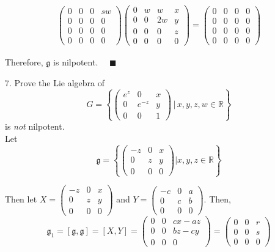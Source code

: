\documentclass[12pt]{article}
\newcommand{\R}{\mathbb{R}}
\newcommand{\g}{\mathfrak{g}}
\newcommand{\qed}{\quad \blacksquare}
\begin{document}
\begin{align*}
\begin{pmatrix}
                0 & 0 & 0 & sw\\ 
                0 & 0 & 0 & 0\\
                0 & 0 & 0 & 0\\
                0 & 0 & 0 & 0
            \end{pmatrix}\begin{pmatrix}
                0 & w & w & x\\ 
                0 & 0 & 2w & y\\
                0 & 0 & 0 & z\\
                0 & 0 & 0 & 0
            \end{pmatrix} = \begin{pmatrix}
                0 & 0 & 0 & 0\\ 
                0 & 0 & 0 & 0\\
                0 & 0 & 0 & 0\\
                0 & 0 & 0 & 0
            \end{pmatrix}
        \end{align*}

        Therefore, $\g$ is nilpotent. $\qed$
    \color{black}


\pagebreak

7.  Prove the Lie algebra of 
\[
G = \left\{\left(\begin{array}{cccc}
e^{z} & 0 & x\\
0 & e^{-z}   & y\\
0 & 0 & 1
\end{array}\right) \, \bigg| \, x,y,z,w \in \R\right\}
\] 
is \emph{not} nilpotent.  \\

    \color{blue}
       Let 
       \[\g = \left\{\begin{pmatrix}
            -z & 0 & x\\
            0 & z & y\\
            0 & 0 & 0
         \end{pmatrix} \bigg\vert x, y, z \in \R\right\}\]

        Then let $X = \begin{pmatrix}
            -z & 0 & x\\
            0 & z & y\\
            0 & 0 & 0
        \end{pmatrix}$ and $Y = \begin{pmatrix}
            -c & 0 & a\\
            0 & c & b\\
            0 & 0 & 0
        \end{pmatrix}$. Then,
        \[\g_1 = [\g, \g] = [X,Y] = \begin{pmatrix}
            0 & 0 & cx - az\\
            0 & 0 & bz - cy\\
            0 & 0 & 0
        \end{pmatrix} = \begin{pmatrix}
            0 & 0 & r\\
            0 & 0 & s\\
            0 & 0 & 0
        \end{pmatrix}\]
        
\end{document}
